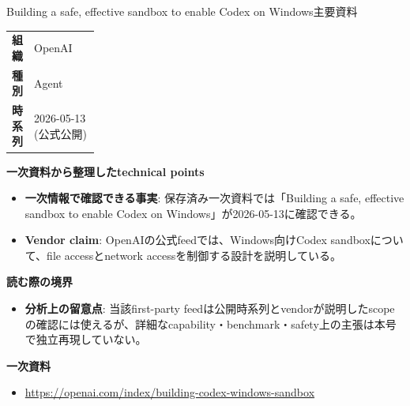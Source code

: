 \begin{technicalnote}{Building a safe, effective sandbox to enable Codex on Windows}{主要資料}
\begingroup
\begin{tabularx}{\linewidth}{@{}>{\bfseries}p{0.22\linewidth}X@{}}
組織 & OpenAI \\
種別 & Agent \\
時系列 & 2026-05-13 (公式公開) \\
\end{tabularx}
\smallskip
{\bfseries 一次資料から整理したtechnical points}
\begin{itemize}[leftmargin=1.5em,itemsep=0.35em]
\item \textbf{一次情報で確認できる事実}: 保存済み一次資料では「Building a safe, effective sandbox to enable Codex on Windows」が2026-05-13に確認できる。
\end{itemize}
\begin{minipage}{\linewidth}
\begin{itemize}[leftmargin=1.5em,itemsep=0.35em]
\item \textbf{Vendor claim}: OpenAIの公式feedでは、Windows向けCodex sandboxについて、file accessとnetwork accessを制御する設計を説明している。
\end{itemize}
{\bfseries 読む際の境界}
\begin{itemize}[leftmargin=1.5em,itemsep=0.35em]
\item \textbf{分析上の留意点}: 当該first-party feedは公開時系列とvendorが説明したscopeの確認には使えるが、詳細なcapability・benchmark・safety上の主張は本号で独立再現していない。
\end{itemize}
\begin{samepage}
{\bfseries 一次資料}
\begingroup\sloppy
\begin{itemize}[leftmargin=1.5em,itemsep=0.25em]
\item {\scriptsize\url{https://openai.com/index/building-codex-windows-sandbox}}
\end{itemize}
\endgroup
\end{samepage}
\end{minipage}
\endgroup
\end{technicalnote}
\medskip

